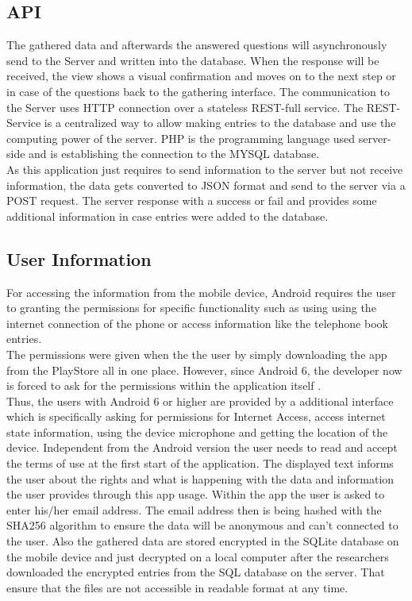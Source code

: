 \subsection{API}
The gathered data and afterwards the answered questions will asynchronously send to the Server and written into the database. When the response will be received, the view shows a visual confirmation and moves on to the next step or in case of the questions back to the gathering interface. 
\bigbreak
The communication to the Server uses HTTP connection over a stateless REST-full service. The REST-Service is a centralized way to allow making entries to the database and use the computing power of the server. PHP is the programming language used server-side and is establishing the connection to the MYSQL database.\\
As this application just requires to send information to the server but not receive information, the data gets converted to JSON format and send to the server via a POST request. The server response with a success or fail and provides some additional information in case entries were added to the database. 

\subsection{User Information}
For accessing the information from the mobile device, Android requires the user to granting the permissions for specific functionality such as using using the internet connection of the phone or access information like the telephone book entries.\\
The permissions were given when the the user by simply downloading the app from the PlayStore all in one place. However, since Android 6, the developer now is forced to ask for the permissions within the application itself  \cite{androidpermissions}.\\
Thus, the users with Android 6 or higher are provided by a additional interface which is specifically asking for permissions for Internet Access, access internet state information, using the device microphone and getting the location of the device. 
\bigbreak
Independent from the Android version the user needs to read and accept the terms of use at the first start of the application. The displayed text informs the user about the rights and what is happening with the data and information the user provides through this app usage.
\bigbreak
Within the app the user is asked to enter his/her email address. The email address then is being hashed with the SHA256 algorithm to ensure the data will be anonymous and can't connected to the user.   
\bigbreak
Also the gathered data are stored encrypted in the SQLite database on the mobile device and just decrypted on a local computer after the researchers downloaded the encrypted entries from the SQL database on the server. That ensure that the files are not accessible in readable format at any time. 

